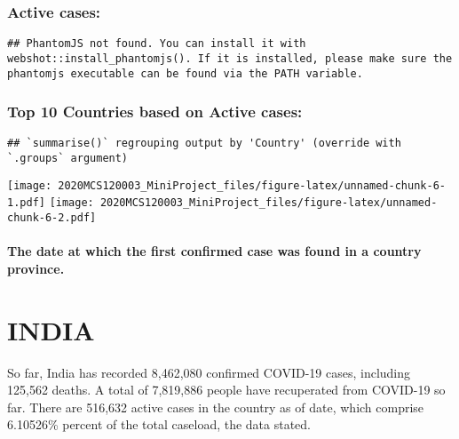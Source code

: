 \documentclass[
]{article}
\begin{document}
\hypertarget{active-cases}{%
\subsubsection{Active cases:}\label{active-cases}}

\begin{verbatim}
## PhantomJS not found. You can install it with webshot::install_phantomjs(). If it is installed, please make sure the phantomjs executable can be found via the PATH variable.
\end{verbatim}

\hypertarget{htmlwidget-5cf6c7be7c67692fa59e}{}
\begin{leaflet}

\end{leaflet}

\hypertarget{top-10-countries-based-on-active-cases}{%
\subsubsection{Top 10 Countries based on Active
cases:}\label{top-10-countries-based-on-active-cases}}

\begin{verbatim}
## `summarise()` regrouping output by 'Country' (override with `.groups` argument)
\end{verbatim}

\texttt{[image: 2020MCS120003\_MiniProject\_files/figure-latex/unnamed-chunk-6-1.pdf]}
\texttt{[image: 2020MCS120003\_MiniProject\_files/figure-latex/unnamed-chunk-6-2.pdf]}

\hypertarget{the-date-at-which-the-first-confirmed-case-was-found-in-a-country-province.}{%
\paragraph{The date at which the first confirmed case was found in a
country
province.}\label{the-date-at-which-the-first-confirmed-case-was-found-in-a-country-province.}}

\hypertarget{india}{%
\section{INDIA}\label{india}}

{}

So far, India has recorded { 8,462,080} confirmed COVID-19 cases,
including { 125,562} deaths. A total of { 7,819,886} people have
recuperated from COVID-19 so far. There are { 516,632} active cases in
the country as of date, which comprise { 6.10526\%} percent of the total
caseload, the data stated.
\end{document}
